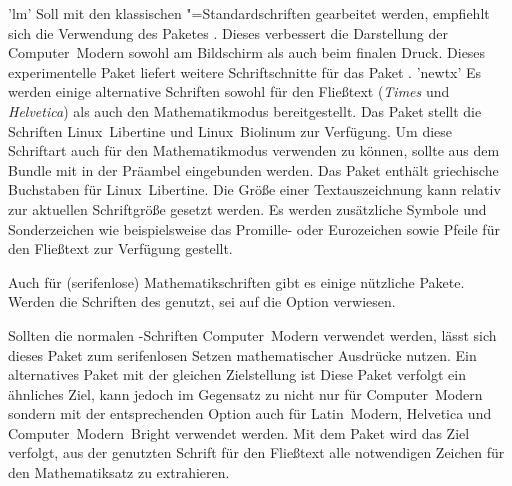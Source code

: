 \begin{DeclarePackages}
'lm'
  Soll mit den klassischen "=Standardschriften gearbeitet 
  werden, empfiehlt sich die Verwendung des Paketes . Dieses 
  verbessert die Darstellung der Computer~Modern sowohl am Bildschirm als auch 
  beim finalen Druck.
  Dieses experimentelle Paket liefert weitere Schriftschnitte für das Paket 
  .
'newtx'
  Es werden einige alternative Schriften sowohl für den Fließtext 
  (\textit{Times} und \textit{Helvetica}) als auch den Mathematikmodus 
  bereitgestellt.
  Das Paket stellt die Schriften Linux~Libertine und Linux~Biolinum zur 
  Verfügung. Um diese Schriftart auch für den Mathematikmodus verwenden zu 
  können, sollte  aus dem Bundle  mit 
   in der 
  Präambel eingebunden werden. Das Paket  enthält griechische 
  Buchstaben für Linux~Libertine.
  Die Größe einer Textauszeichnung kann relativ zur aktuellen Schriftgröße 
  gesetzt werden.
  Es werden zusätzliche Symbole und Sonderzeichen wie beispielsweise das 
  Promille- oder Eurozeichen sowie Pfeile für den Fließtext zur Verfügung 
  gestellt.
\end{DeclarePackages}

%
Auch für (serifenlose) Mathematikschriften gibt es einige nützliche Pakete. 
Werden die Schriften des \CDs genutzt, sei auf die Option  
verwiesen.

\begin{DeclarePackages}
  Sollten die normalen -Schriften Computer~Modern verwendet 
  werden, lässt sich dieses Paket zum serifenlosen Setzen mathematischer 
  Ausdrücke nutzen. Ein alternatives Paket mit der gleichen Zielstellung ist 
  Diese Paket verfolgt ein ähnliches Ziel, kann jedoch im Gegensatz zu 
   nicht nur für Computer~Modern sondern mit der 
  entsprechenden Option auch für Latin~Modern, Helvetica und 
  Computer~Modern~Bright verwendet werden.
  Mit dem Paket wird das Ziel verfolgt, aus der genutzten Schrift für den 
  Fließtext alle notwendigen Zeichen für den Mathematiksatz zu extrahieren.
\end{DeclarePackages}



